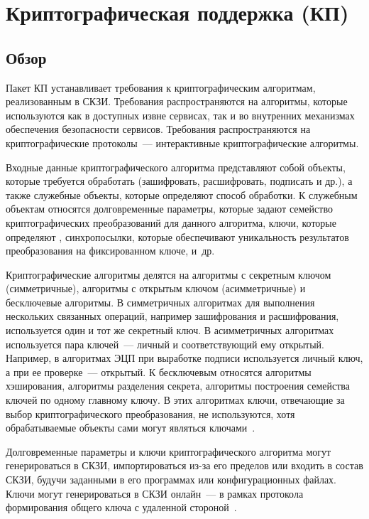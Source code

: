 \section{Криптографическая поддержка (КП)}\label{CS}

\subsection{Обзор}\label{CS.Intro}

Пакет КП устанавливает требования к криптографическим алгоритмам, реализованным
в СКЗИ.
%
Требования распространяются на алгоритмы, которые используются как в доступных
извне сервисах, так и во внутренних механизмах обеспечения безопасности
сервисов.
%
Требования распространяются на криптографические протоколы~---
интерактивные криптографические алгоритмы.

Входные данные криптографического алгоритма представляют собой объекты, которые
требуется обработать (зашифровать, расшифровать, подписать и др.), а также
служебные объекты, которые определяют способ обработки.
%
К служебным объектам относятся долговременные параметры, которые задают
семейство криптографических преобразований для данного алгоритма, ключи, которые
определяют , синхропосылки, которые 
обеспечивают уникальность результатов преобразования на фиксированном ключе, 
и~др. 


Криптографические алгоритмы делятся на алгоритмы с секретным ключом
(симметричные), алгоритмы с открытым ключом (асимметричные) и бесключевые
алгоритмы.
%
В симметричных алгоритмах для выполнения нескольких связанных операций, например
зашифрования и расшифрования, используется один и тот же секретный ключ.
%
В асимметричных алгоритмах используется пара ключей~--- личный и соответствующий
ему открытый. Например, в алгоритмах ЭЦП при выработке подписи используется
личный ключ, а при ее проверке~--- открытый.
%
К бесключевым относятся алгоритмы хэширования, алгоритмы разделения секрета,
алгоритмы построения семейства ключей по одному главному ключу. В этих
алгоритмах ключи, отвечающие за выбор криптографического преобразования, не
используются, хотя обрабатываемые объекты сами могут являться 
ключами~.

Долговременные параметры и ключи криптографического алгоритма
могут генерироваться в СКЗИ, импортироваться из-за его 
пределов или входить в состав СКЗИ, будучи заданными в его программах или 
конфигурационных файлах.
%
Ключи могут генерироваться в СКЗИ онлайн~--- в рамках протокола 
формирования общего ключа с удаленной стороной~.

